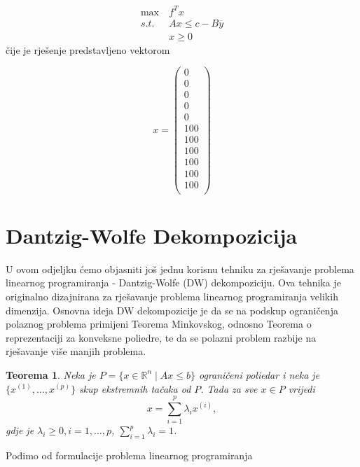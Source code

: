 \documentclass[a4paper, utf8, 11pt, colorlinks]{book}
\newtheorem{thm}{Teorema}
\begin{document}
 \begin{equation}\label{primer:formulacija3}
	\begin{aligned}
		\max\  &f^Tx\\
		s.t.\  &Ax\leqslant c-B\overline{y}\\
		&x\geqslant 0
	\end{aligned}
\end{equation}
čije je rješenje predstavljeno vektorom

$$x =\left(\begin{array}{c}
	0\\
	0\\
	0\\
	0\\
	0\\
	100\\
	100\\
	100\\
	100\\
	100\\
	100\\
\end{array}\right)$$



  \section{Dantzig-Wolfe Dekompozicija}%
 
 U ovom odjeljku ćemo objasniti još jednu korisnu tehniku za rješavanje problema linearnog programiranja - Dantzig-Wolfe (DW) dekompoziciju. Ova tehnika je originalno dizajnirana za rješavanje problema linearnog programiranja velikih dimenzija. Osnovna ideja DW dekompozicije je da se na podskup ograničenja polaznog problema primijeni Teorema Minkovskog, odnosno Teorema o reprezentaciji za konveksne poliedre, te da se polazni problem razbije na rješavanje više manjih problema.
 
 \begin{thm}
 	Neka je $P = \{ x \in \mathbb{R}^n \mid Ax \leq b\}$ ograničeni poliedar i neka je $\{x^{(1)}, \ldots, x^{(p)} \}$ skup ekstremnih tačaka od $P$. Tada za sve $x \in P$ vrijedi 
 	 $$ x = \sum_{i=1}^p \lambda_i x^{(i)},$$ 
 	 gdje je $\lambda_i \geq 0,i=1,\ldots,p$, $\sum_{i=1}^p \lambda_i=1$.
 \end{thm}
 
 Pođimo od formulacije problema linearnog programiranja
 
\end{document}
